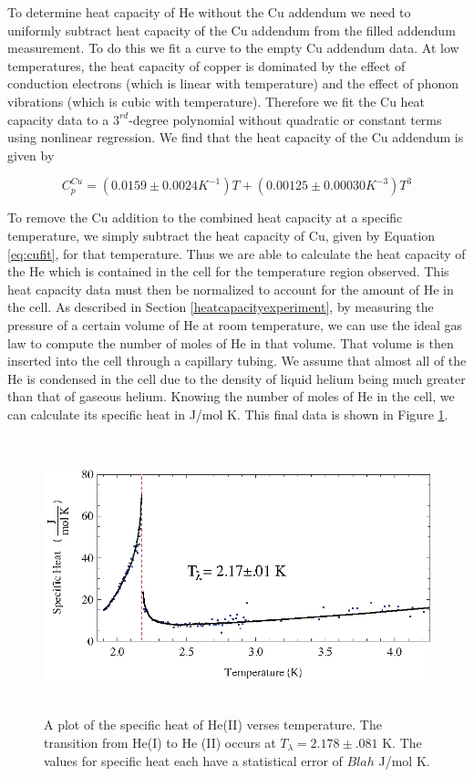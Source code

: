 To determine heat capacity of He without the Cu addendum we need to uniformly subtract heat capacity of the Cu addendum from the filled addendum measurement.  To do this we fit a curve to the empty Cu addendum data.  At low temperatures, the heat capacity of copper is dominated by the effect of conduction electrons (which is linear with temperature) and the effect of phonon vibrations (which is cubic with temperature).  Therefore we fit the Cu heat capacity data to a $3^{rd}$-degree polynomial without  quadratic or constant terms using nonlinear regression.  We find that the heat capacity of the Cu addendum is given by

\begin{center}
\begin{equation}\label{eq:cufit}
C^{Cu}_{p} =( 0.0159\pm0.0024 K^{-1}) T + (0.00125\pm0.00030 K^{-3}) T^{3} 
\end{equation}
\end{center}

To remove the Cu addition to the combined heat capacity at a specific temperature, we simply subtract the heat capacity of Cu, given by Equation \ref{eq:cufit}, for that temperature. Thus we are able to calculate the heat capacity of the He which is contained in the cell for the temperature region observed.  This heat capacity data must then be normalized to account for the amount of He in the cell. As described in Section \ref{heatcapacityexperiment}, by measuring the pressure of a certain volume of He at room temperature, we can use the ideal gas law to compute the number of moles of He in that volume.  That volume is then inserted into the cell through a capillary tubing.  We assume that almost all of the He is condensed in the cell due to the density of liquid helium being much greater than that of gaseous helium.  Knowing the number of moles of He in the cell, we can calculate its specific heat in J/mol K. This final data is shown in Figure \ref{fig:lambdatrans}.

\begin{figure}[htbp]
\begin{center}
\includegraphics[height=80mm]{./figures/lambdatrans.eps}
\caption{\small{A plot of the specific heat of He(II) verses temperature. The transition from He(I) to He (II) occurs at $T_{\lambda} = 2.178 \pm .081$ K.  The values for specific heat each have a statistical error of $Blah$ J/mol K.}}
\label{fig:lambdatrans}
\end{center}
\end{figure}

